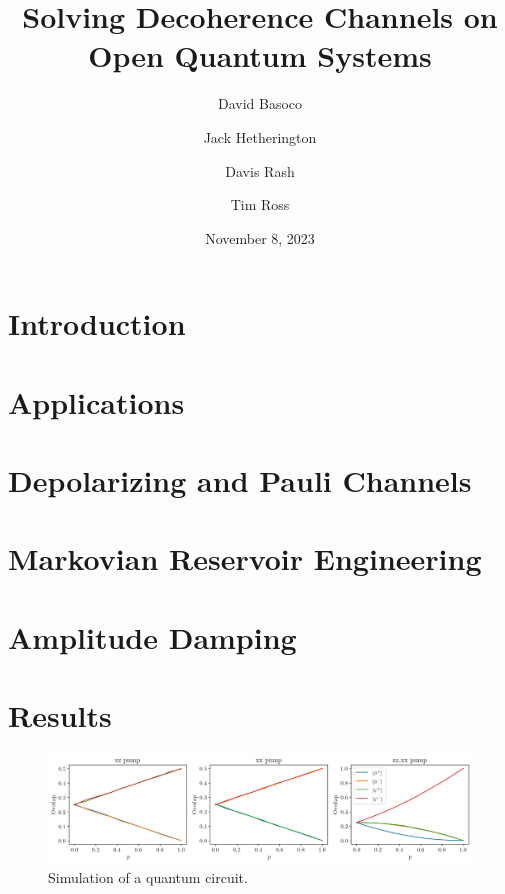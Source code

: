 \documentclass[12pt]{article}
\title{Solving Decoherence Channels on Open Quantum Systems}
\author{David Basoco \and Jack Hetherington \and Davis Rash \and Tim Ross}
\date{November 8, 2023}
\begin{document}
  \maketitle

  \section{Introduction}
  \blindtext

  \section{Applications}
  \blindtext

  \section{Depolarizing and Pauli Channels}
  \blindtext

  \section{Markovian Reservoir Engineering}
  \blindtext

  \section{Amplitude Damping}
  \blindtext

  \section{Results}
  \blindtext

  \begin{figure}
    \centering
    \includegraphics[width=\textwidth]{images/reservoir-engineering-simulation}
    \caption{Simulation of a quantum circuit.%
      \label{fig:reservoir-engineering-simulation}}
  \end{figure}

  \printbibliography
\end{document}
